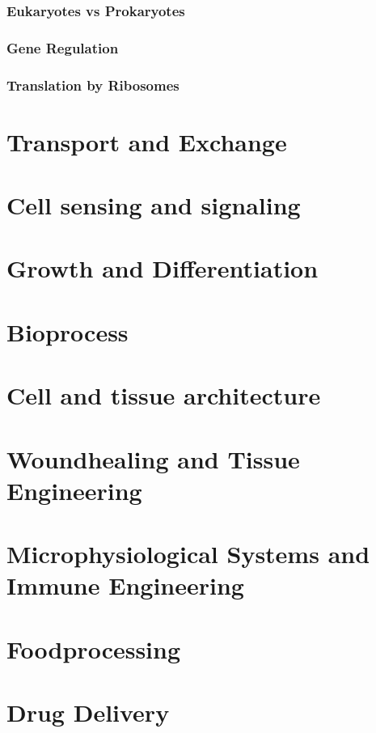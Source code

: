 \documentclass[12pt]{cheatsheet}
\begin{document}
\subsubsection*{Eukaryotes vs Prokaryotes}

\subsubsection*{Gene Regulation}

\subsubsection*{Translation by Ribosomes}



\section*{Transport and Exchange}

\section*{Cell sensing and signaling}

\section*{Growth and Differentiation}

\section*{Bioprocess}

\section*{Cell and tissue architecture}

\section*{Woundhealing and Tissue Engineering}

\section*{Microphysiological Systems and Immune Engineering}

\section*{Foodprocessing}

\section*{Drug Delivery}
\end{document}
